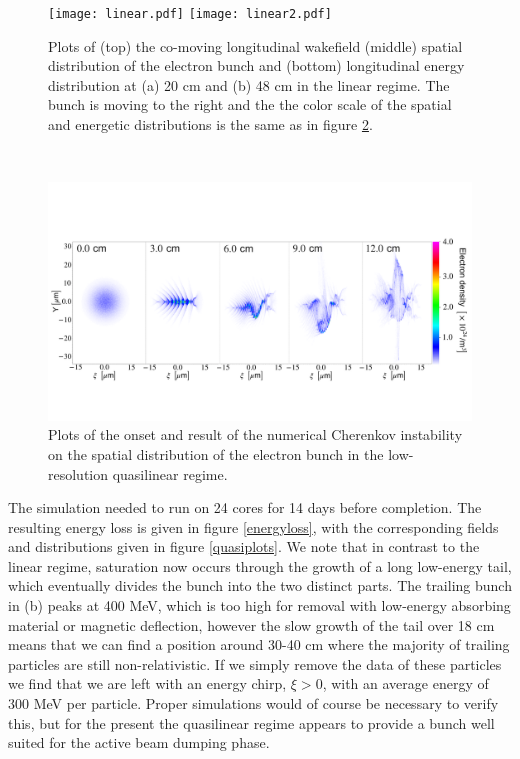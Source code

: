 \begin{figure}
\centering
\texttt{[image: linear.pdf]}\hspace{24pt}
\texttt{[image: linear2.pdf]}
\caption{\small{Plots of (top) the co-moving longitudinal wakefield (middle) spatial distribution of the electron bunch and (bottom) longitudinal energy distribution at (a) 20 cm and (b) 48 cm in the linear regime. The bunch is moving to the right and the the color scale of the spatial and energetic distributions is the same as in figure \ref{cherenkov}.}\vspace{-5pt}}
\label{linearplots}
\end{figure}
\vspace{-4pt}\\
\begin{figure}[!ht]
\centering
\includegraphics[width=\textwidth]{cherenkov_color}
\caption{\small{Plots of the onset and result of the numerical Cherenkov instability on the spatial distribution of the electron bunch in the low-resolution quasilinear regime.}}
\label{cherenkov}
\end{figure}
\clearpage
\noindent The simulation needed to run on 24 cores for 14 days before completion. The resulting energy loss is given in figure \ref{energyloss}, with the corresponding fields and distributions given in figure \ref{quasiplots}. We note that in contrast to the linear regime, saturation now occurs through the growth of a long low-energy tail, which eventually divides the bunch into the two distinct parts. The trailing bunch in (b) peaks at 400 MeV, which is too high for removal with low-energy absorbing material or magnetic deflection, however the slow growth of the tail over 18 cm means that we can find a position around 30-40 cm where the majority of trailing particles are still non-relativistic. If we simply remove the data of these particles we find that we are left with an energy chirp, $\xi>0$, with an average energy of $300$ MeV per particle. Proper simulations would of course be necessary to verify this, but for the present the quasilinear regime appears to provide a bunch well suited for the active beam dumping phase. 

